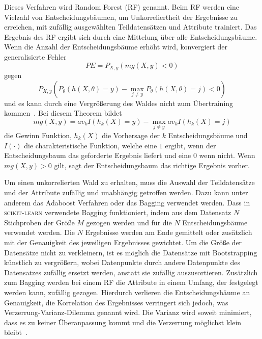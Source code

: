 Dieses Verfahren wird Random Forest (RF) genannt. Beim RF werden eine Vielzahl von Entscheidungsbäumen, um Unkorreliertheit der Ergebnisse zu erreichen, mit
zufällig ausgewählten Teildatensätzen und Attribute trainiert. Das Ergebnis des RF ergibt sich durch eine Mittelung über alle Entscheidungsbäume.
Wenn die Anzahl der Entscheidungsbäume erhöht wird, konvergiert der generalisierte Fehler
\begin{equation}
  PE = P_{X,y}(mg(X,y)<0)
\end{equation}
gegen
\begin{equation}
  P_{X,y}(P_\theta(h(X,\theta)=y)-\max_{j\neq y}P_\theta(h(X,\theta)=j)<0)
\end{equation}
und es kann durch eine Vergrößerung des Waldes nicht zum Übertraining kommen~\cite[7]{RandomForests_Breiman}. Bei diesem Theorem bildet
\begin{equation}
  mg(X,y) = av_k I(h_k(X)=y) - \max_{j \neq y}av_k I(h_k(X)=j)
\end{equation}
die Gewinn Funktion, $h_k(X)$ die Vorhersage der $k$ Entscheidungsbäume und $I(\cdot)$ die charakteristische Funktion, welche eine $1$ ergibt, wenn der
Entscheidungsbaum das geforderte Ergebnis liefert und eine $0$ wenn nicht.
Wenn $mg(X,y) > 0$ gilt, sagt der Entscheidungsbaum das richtige Ergebnis vorher.

Um einen unkorrelierten Wald zu erhalten, muss die Auswahl der Teildatensätze und der Attribute zufällig und unabhängig getroffen werden.
Dazu kann unter anderem das Adaboost Verfahren oder das Bagging verwendet werden.
Dass in \textsc{scikit-learn} verwendete Bagging funktioniert, indem aus dem Datensatz $N$ Stichproben der Größe $M$ gezogen werden und für die $N$ Entscheidungsbäume verwendet werden.
Die $N$ Ergebnisse werden am Ende gemittelt oder zusätzlich mit der Genauigkeit des jeweiligen Ergebnisses gewichtet.
Um die Größe der Datensätze nicht zu verkleinern, ist es möglich die Datensätze mit Bootstrapping künstlich zu vergrößern, wobei Datenpunkte durch andere Datenpunkte
des Datensatzes zufällig ersetzt werden, anstatt sie zufällig auszusortieren.
Zusätzlich zum Bagging werden bei einem RF die Attribute in einem Umfang, der festgelegt werden kann, zufällig gezogen.
Hierdurch verlieren die Entscheidungsbäume an Genauigkeit, die Korrelation des Ergebnisses verringert sich jedoch,
was Verzerrung-Varianz-Dilemma genannt wird. Die Varianz wird soweit minimiert, dass es zu keiner Überanpassung kommt
und die Verzerrung möglichst klein bleibt~\cite[2]{Hyperparameter_RF}.

